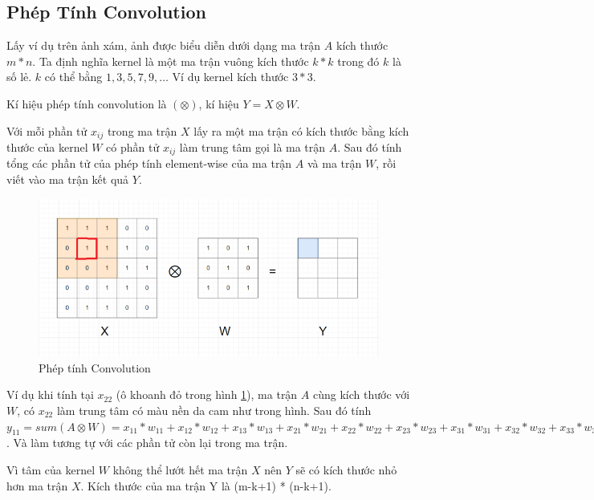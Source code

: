 \subsection{Phép Tính Convolution}
\label{ss: convolution}
Lấy ví dụ trên ảnh xám, ảnh được biểu diễn dưới dạng ma trận $A$ kích thước $m*n$.
Ta định nghĩa kernel là một ma trận vuông kích thước $k*k$ trong đó $k$ là số lẻ. $k$ có thể bằng $1, 3, 5, 7, 9,…$ Ví dụ kernel kích thước $3*3$.

Kí hiệu phép tính convolution là $(\otimes)$, kí hiệu $Y = X \otimes W$.

Với mỗi phần tử $x_{ij}$ trong ma trận $X$ lấy ra một ma trận có kích thước bằng kích thước của kernel $W$ có phần tử $x_{ij}$ làm trung tâm gọi là ma trận $A$. Sau đó tính tổng các phần tử của phép tính element-wise của ma trận $A$ và ma trận $W$, rồi viết vào ma trận kết quả $Y$.

\FloatBarrier
\begin{figure}[htp]
\begin{center}
\includegraphics[scale=0.65]{chap2/c2_figs/9.png}
\end{center}
\caption{Phép tính Convolution}
\label{fig:convolution}
\end{figure}
\FloatBarrier

Ví dụ khi tính tại $x_{22}$ (ô khoanh đỏ trong hình \ref{fig:convolution}), ma trận $A$ cùng kích thước với $W$, có $x_{22}$ làm trung tâm có màu nền da cam như trong hình. Sau đó tính $y_{11} = sum(A \otimes W) = x_{11}*w_{11} + x_{12}*w_{12} + x_{13}*w_{13} + x_{21}*w_{21} + x_{22}*w_{22} + x_{23}*w_{23} + x_{31}*w_{31} + x_{32}*w_{32} + x_{33}*w_{33} = 4$. Và làm tương tự với các phần tử còn lại trong ma trận.

Vì tâm của kernel $W$ không thể lướt hết ma trận $X$ nên $Y$ sẽ có kích thước nhỏ hơn ma trận $X$. Kích thước của ma trận Y là (m-k+1) * (n-k+1).

